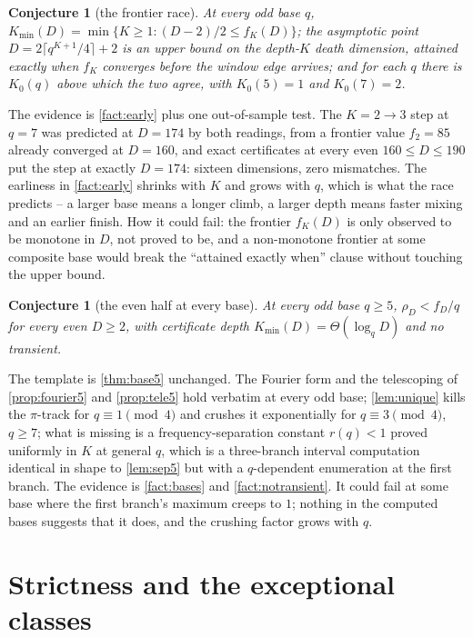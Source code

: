 \documentclass[11pt]{amsart}
\newtheorem{conjecture}[theorem]{Conjecture}
\theoremstyle{definition}
\theoremstyle{remark}
\begin{document}
\begin{conjecture}[the frontier race]
\label{con:frontier}
At every odd base $q$, $K_{\min}(D) = \min\{K \ge 1 : (D-2)/2 \le f_K(D)\}$; the asymptotic point $D = 2\lceil q^{K+1}/4\rceil + 2$ is an upper bound on the depth-$K$ death dimension, attained exactly when $f_K$ converges before the window edge arrives; and for each $q$ there is $K_0(q)$ above which the two agree, with $K_0(5) = 1$ and $K_0(7) = 2$.
\end{conjecture}

The evidence is \cref{fact:early} plus one out-of-sample test. The $K = 2 \to 3$ step at $q = 7$ was predicted at $D = 174$ by both readings, from a frontier value $f_2 = 85$ already converged at $D = 160$, and exact certificates at every even $160 \le D \le 190$ put the step at exactly $D = 174$: sixteen dimensions, zero mismatches. The earliness in \cref{fact:early} shrinks with $K$ and grows with $q$, which is what the race predicts -- a larger base means a longer climb, a larger depth means faster mixing and an earlier finish. How it could fail: the frontier $f_K(D)$ is only observed to be monotone in $D$, not proved to be, and a non-monotone frontier at some composite base would break the ``attained exactly when'' clause without touching the upper bound.

\begin{conjecture}[the even half at every base]
\label{con:allbases}
At every odd base $q \ge 5$, $\rho_D < f_D/q$ for every even $D \ge 2$, with certificate depth $K_{\min}(D) = \Theta(\log_q D)$ and no transient.
\end{conjecture}

The template is \cref{thm:base5} unchanged. The Fourier form and the telescoping of \cref{prop:fourier5} and \cref{prop:tele5} hold verbatim at every odd base; \cref{lem:unique} kills the $\pi$-track for $q \equiv 1 \pmod 4$ and crushes it exponentially for $q \equiv 3 \pmod 4$, $q \ge 7$; what is missing is a frequency-separation constant $r(q) < 1$ proved uniformly in $K$ at general $q$, which is a three-branch interval computation identical in shape to \cref{lem:sep5} but with a $q$-dependent enumeration at the first branch. The evidence is \cref{fact:bases} and \cref{fact:notransient}. It could fail at some base where the first branch's maximum creeps to $1$; nothing in the computed bases suggests that it does, and the crushing factor grows with $q$.

\section{Strictness and the exceptional classes}
\label{b:sec:strict}
\end{document}
